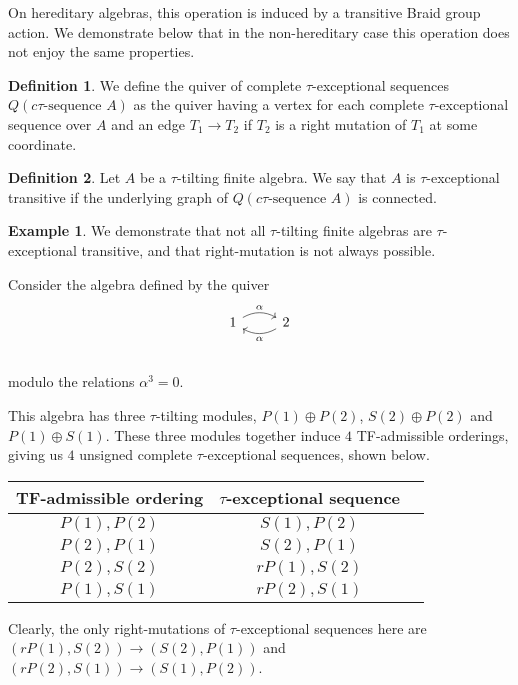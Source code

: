 \documentclass[]{article}
\theoremstyle{definition}
\newtheorem{definition}{Definition}[section]
\newtheorem{example}{Example}[section]
\newcommand{\tu}{\ensuremath{\tau}}
\begin{document}
On hereditary algebras, this operation is induced by a transitive Braid group action. We demonstrate below that in the non-hereditary case this operation does not enjoy the same properties.

\begin{definition}
	We define the quiver of complete \tu-exceptional sequences $Q(c\tu \text{-sequence } A)$ as the quiver having a vertex for each complete \tu-exceptional sequence over $A$ and an edge $T_1 \to T_2$ if $T_2$ is a right mutation of $T_1$ at some coordinate.
\end{definition}

\begin{definition}
	Let $A$ be a \tu-tilting finite algebra. We say that $A$ is \tu-exceptional transitive if the underlying graph of $Q(c\tu \text{-sequence } A)$ is connected.
\end{definition}



\begin{example}
	We demonstrate that not all \tu-tilting finite algebras are \tu-exceptional transitive, and that right-mutation is not always possible.
	
	Consider the algebra defined by the quiver
	\[
	\begin{tikzcd}
	1 \arrow[r,bend left,"\alpha"] & 2 \arrow[l,bend left,"\alpha"]  \\
	\end{tikzcd}
	\]
	
	modulo the relations $\alpha^3 = 0$.
	
	This algebra has three $\tau$-tilting modules, $P(1) \oplus P(2)$, $S(2) \oplus P(2)$ and $P(1) \oplus S(1)$. These three modules together induce $4$ TF-admissible orderings, giving us $4$ unsigned complete \tu-exceptional sequences, shown below.
	
	\begin{center}
		\begin{tabular}{ |c|c|c| } 
			\hline
			TF-admissible ordering & $\tau$-exceptional sequence \\
			\hline
			$P(1),P(2)$ & $S(1),P(2)$ \\ 
			$P(2),P(1)$ & $S(2),P(1)$ \\ 
			$P(2),S(2)$ & $rP(1),S(2)$\\ 
			$P(1),S(1)$ & $rP(2),S(1)$ \\
			\hline
		\end{tabular}
	\end{center}

	
	
	Clearly, the only right-mutations of $\tau$-exceptional sequences here are $(rP(1),S(2)) \to (S(2),P(1))$ and $(rP(2),S(1)) \to (S(1),P(2))$. 
\end{example}
\end{document}

